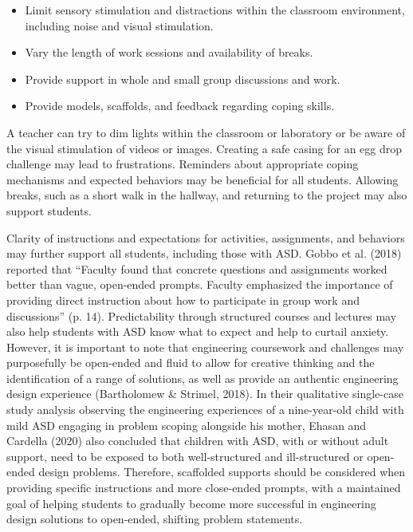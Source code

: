 \documentclass[11.5pt]{sig-alternate}
\begin{document}
\begin{large}
\begin{itemize}
    \item 	Limit sensory stimulation and distractions within the classroom environment, including noise and visual stimulation.
    \item 	Vary the length of work sessions and availability of breaks.
    \item 	Provide support in whole and small group discussions and work.
    \item 	Provide models, scaffolds, and feedback regarding coping skills.
\end{itemize}

A teacher can try to dim lights within the classroom or laboratory or be aware of the visual stimulation of videos or images. Creating a safe casing for an egg drop challenge may lead to frustrations. Reminders about appropriate coping mechanisms and expected behaviors may be beneficial for all students. Allowing breaks, such as a short walk in the hallway, and returning to the project may also support students. 

Clarity of instructions and expectations for activities, assignments, and behaviors may further support all students, including those with ASD. Gobbo et al. (2018) reported that “Faculty found that concrete questions and assignments worked better than vague, open-ended prompts. Faculty emphasized the importance of providing direct instruction about how to participate in group work and discussions” (p. 14). Predictability through structured courses and lectures may also help students with ASD know what to expect and help to curtail anxiety. However, it is important to note that engineering coursework and challenges may purposefully be open-ended and fluid to allow for creative thinking and the identification of a range of solutions, as well as provide an authentic engineering design experience (Bartholomew \& Strimel, 2018). In their qualitative single-case study analysis observing the engineering experiences of a nine-year-old child with mild ASD engaging in problem scoping alongside his mother, Ehasan and Cardella (2020) also concluded that children with ASD, with or without adult support, need to be exposed to both well-structured and ill-structured or open-ended design problems. Therefore, scaffolded supports should be considered when providing specific instructions and more close-ended prompts, with a maintained goal of helping students to gradually become more successful in engineering design solutions to open-ended, shifting problem statements. 


\end{large}
\end{document}
